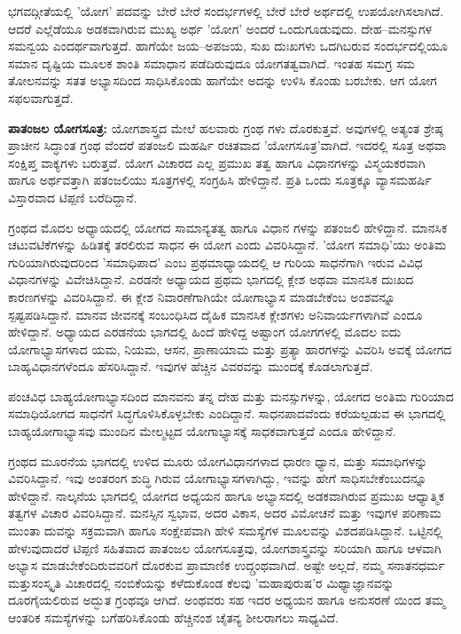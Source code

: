 ಭಗವದ್ಗೀತೆಯಲ್ಲಿ 'ಯೋಗ' ಪದವನ್ನು ಬೇರೆ ಬೇರೆ ಸಂದರ್ಭಗಳಲ್ಲಿ ಬೇರೆ ಬೇರೆ ಅರ್ಥದಲ್ಲಿ ಉಪಯೋಗಿಸಲಾಗಿದೆ. ಆದರೆ ಎಲ್ಲೆಡೆಯೂ ಅಡಕವಾಗಿರುವ ಮುಖ್ಯ ಅರ್ಥ 'ಯೋಗ' ಅಂದರೆ ಒಂದುಗೂಡುವುದು. ದೇಹ–ಮನಸ್ಸುಗಳ ಸಮನ್ವಯ ಎಂದರ್ಥವಾಗುತ್ತದೆ. ಹಾಗೆಯೇ ಜಯ–ಅಪಜಯ, ಸುಖ ದುಃಖಗಳು ಒದಗಿಬರುವ ಸಂದರ್ಭದಲ್ಲಿಯೂ ಸಮಾನ ದೃಷ್ಟಿಯ ಮೂಲಕ ಶಾಂತಿ ಸಮಾಧಾನ ಪಡೆದಿರುವುದೂ ಯೋಗತತ್ವವಾಗಿದೆ. ಇಂತಹ ಸಮಗ್ರ ಸಮ ತೋಲನವನ್ನು ಸತತ ಅಭ್ಯಾಸದಿಂದ ಸಾಧಿಸಿಕೊಂಡು ಹಾಗೆಯೇ ಅದನ್ನು ಉಳಿಸಿ ಕೊಂಡು ಬರಬೇಕು. ಆಗ ಯೋಗ ಸಫಲವಾಗುತ್ತದೆ.

\textbf{ಪಾತಂಜಲ ಯೋಗಸೂತ್ರ:} ಯೋಗಶಾಸ್ತ್ರದ ಮೇಲೆ ಹಲವಾರು ಗ್ರಂಥ ಗಳು ದೊರಕುತ್ತವೆ. ಅವುಗಳಲ್ಲಿ ಅತ್ಯಂತ ಶ್ರೇಷ್ಠ ಪ್ರಾಚೀನ ಸಿದ್ಧಾಂತ ಗ್ರಂಥ ವೆಂದರೆ ಪತಂಜಲಿ ಮಹರ್ಷಿ ರಚಿತವಾದ 'ಯೋಗಸೂತ್ರ'ವಾಗಿದೆ. ಇದರಲ್ಲಿ  ಸೂತ್ರ ಅಥವಾ ಸಂಕ್ಷಿಪ್ತ ವಾಕ್ಯಗಳು ಬರುತ್ತವೆ. ಯೋಗ ವಿಚಾರದ ಎಲ್ಲ ಪ್ರಮುಖ ತತ್ವ ಹಾಗೂ ವಿಧಾನಗಳನ್ನು ವಿಸ್ಮಯಕರವಾಗಿ ಹಾಗೂ ಅರ್ಥವತ್ತಾಗಿ ಪತಂಜಲಿಯು ಸೂತ್ರಗಳಲ್ಲಿ ಸಂಗ್ರಹಿಸಿ ಹೇಳಿದ್ದಾನೆ. ಪ್ರತಿ ಒಂದು ಸೂತ್ರಕ್ಕೂ ವ್ಯಾಸಮಹರ್ಷಿ ವಿಸ್ತಾರವಾದ ಟಿಪ್ಪಣಿ ಬರೆದಿದ್ದಾನೆ.

ಗ್ರಂಥದ ಮೊದಲ ಅಧ್ಯಾಯದಲ್ಲಿ ಯೋಗದ ಸಾಮಾನ್ಯತತ್ವ ಹಾಗೂ ವಿಧಾನ ಗಳನ್ನು ಪತಂಜಲಿ ಹೇಳಿದ್ದಾನೆ. ಮಾನಸಿಕ ಚಟುವಟಿಕೆಗಳನ್ನು ಹಿಡಿತಕ್ಕೆ ತರಲಿರುವ ಸಾಧನ ಈ ಯೋಗ ಎಂದು ವಿವರಿಸಿದ್ದಾನೆ. 'ಯೋಗ ಸಮಾಧಿ'ಯು ಅಂತಿಮ ಗುರಿಯಾಗಿರುವುದರಿಂದ 'ಸಮಾಧಿಪಾದ' ಎಂಬ ಪ್ರಥಮಾಧ್ಯಾಯದಲ್ಲಿ ಆ ಗುರಿಯ ಸಾಧನೆಗಾಗಿ ಇರುವ ವಿವಿಧ ವಿಧಾನಗಳನ್ನು ವಿವೇಚಿಸಿದ್ದಾನೆ. ಎರಡನೇ ಅಧ್ಯಾಯದ ಪ್ರಥಮ ಭಾಗದಲ್ಲಿ ಕ್ಲೇಶ ಅಥವಾ ಮಾನಸಿಕ ದುಃಖದ ಕಾರಣಗಳನ್ನು ವಿವರಿಸಿದ್ದಾನೆ. ಈ ಕ್ಲೇಶ ನಿವಾರಣೆಗಾಗಿಯೇ ಯೋಗಾಭ್ಯಾಸ ಮಾಡಬೇಕೆಂಬ ಅಂಶವನ್ನೂ ಸ್ಪಷ್ಟಪಡಿಸಿದ್ದಾನೆ. ಮಾನವ ಜೀವನಕ್ಕೆ ಸಂಬಂಧಿಸಿದ ದೈಹಿಕ ಮಾನಸಿಕ ಕ್ಲೇಶಗಳು ಅನಿವಾರ್ಯಗಳಾಗಿವೆ ಎಂದೂ ಹೇಳಿದ್ದಾನೆ. ಅಧ್ಯಾಯದ ಎರಡನೆಯ ಭಾಗದಲ್ಲಿ ಹಿಂದೆ ಹೇಳಿದ್ದ ಅಷ್ಟಾಂಗ ಯೋಗಗಳಲ್ಲಿ ಮೊದಲ ಐದು ಯೋಗಾಭ್ಯಾಸಗಳಾದ ಯಮ, ನಿಯಮ, ಆಸನ, ಪ್ರಾಣಾಯಾಮ ಮತ್ತು ಪ್ರತ್ಯಾ ಹಾರಗಳನ್ನು ವಿವರಿಸಿ ಅವಕ್ಕೆ ಯೋಗದ ಬಾಹ್ಯವಿಧಾನಗಳೆಂದೂ ಹೆಸರಿಸಿದ್ದಾನೆ. ಇವುಗಳ ಹೆಚ್ಚಿನ ವಿವರವನ್ನು ಮುಂದಕ್ಕೆ ಕೊಡಲಾಗುತ್ತದೆ.

ಪಂಚವಿಧ ಬಾಹ್ಯಯೋಗಾಭ್ಯಾಸದಿಂದ ಮಾನವನು ತನ್ನ ದೇಹ ಮತ್ತು ಮನಸ್ಸುಗಳನ್ನು, ಯೋಗದ ಅಂತಿಮ ಗುರಿಯಾದ ಸಮಾಧಿಯೋಗದ ಸಾಧನೆಗೆ ಸಿದ್ಧಗೊಳಿಸಿಕೊಳ್ಳಬೇಕು ಎಂದಿದ್ದಾನೆ. ಸಾಧನಪಾದವೆಂದು ಕರೆಯಲ್ಪಡುವ ಈ ಭಾಗದಲ್ಲಿ ಬಾಹ್ಯಯೋಗಾಭ್ಯಾಸವು ಮುಂದಿನ ಮೇಲ್ಮಟ್ಟದ ಯೋಗಾಭ್ಯಾಸಕ್ಕೆ ಸಾಧಕವಾಗುತ್ತದೆ ಎಂದೂ ಹೇಳಿದ್ದಾನೆ.

ಗ್ರಂಥದ ಮೂರನೆಯ ಭಾಗದಲ್ಲಿ ಉಳಿದ ಮೂರು ಯೋಗವಿಧಾನಗಳಾದ ಧಾರಣ ಧ್ಯಾನ, ಮತ್ತು ಸಮಾಧಿಗಳನ್ನು ವಿವರಿಸಿದ್ದಾನೆ. ಇವು ಅಂತರಂಗ ಶುದ್ಧಿ ಗಿರುವ ಯೋಗಾಭ್ಯಾಸಗಳಾಗಿದ್ದು, ಇವನ್ನು ಹೇಗೆ ಸಾಧಿಸಬೇಕೆಂಬುದನ್ನೂ ಹೇಳಿದ್ದಾನೆ. ನಾಲ್ಕನೆಯ ಭಾಗದಲ್ಲಿ ಯೋಗದ ಅಧ್ಯಯನ ಹಾಗೂ ಅಭ್ಯಾಸದಲ್ಲಿ ಅಡಕವಾಗಿರುವ ಪ್ರಮುಖ ಆಧ್ಯಾತ್ಮಿಕ ತತ್ವಗಳ ವಿಚಾರ ವಿವರಿಸಿದ್ದಾನೆ. ಮನಸ್ಸಿನ ಸ್ವಭಾವ, ಅದರ ವಿಕಾಸ, ಅದರ ವಿಮೋಚನೆ ಮತ್ತು ಇವುಗಳ ಪರಿಣಾಮ ಮುಂತಾ ದುವನ್ನು ಸಕ್ರಮವಾಗಿ ಹಾಗೂ ಸಂಕ್ಷೇಪವಾಗಿ ಹೇಳಿ ಸಮಸ್ಯೆಗಳ ಮೂಲವನ್ನು ವಿಶದಪಡಿಸಿದ್ದಾನೆ. ಒಟ್ಟಿನಲ್ಲಿ ಹೇಳುವುದಾದರೆ ಟಿಪ್ಪಣಿ ಸಹಿತವಾದ ಪಾತಂಜಲ ಯೋಗಸೂತ್ರವು, ಯೋಗಶಾಸ್ತ್ರವನ್ನು ಸರಿಯಾಗಿ ಹಾಗೂ ಆಳವಾಗಿ ಅಭ್ಯಾಸ ಮಾಡಬೇಕೆಂದಿರುವವರಿಗೆ ದೊರಕುವ ಪ್ರಾಮಾಣಿಕ ಉದ್ಗ್ರಂಥವಾಗಿದೆ. ಅಷ್ಟೇ ಅಲ್ಲದೆ, ನಮ್ಮ ಸನಾತನಧರ್ಮ ಮತ್ತುಸಂಸ್ಕೃತಿ ವಿಚಾರದಲ್ಲಿ ನಂಬಿಕೆಯನ್ನು ಕಳೆದುಕೊಂಡ ಕೆಲವು 'ಮಹಾಪುರುಷ'ರ ಮಿಥ್ಯಾಜ್ಞಾನವನ್ನು ದೂರಗೈಯಲಿರುವ ಅದ್ಭುತ ಗ್ರಂಥವೂ ಆಗಿದೆ. ಅಂಥವರು ಸಹ ಇದರ ಅಧ್ಯಯನ ಹಾಗೂ ಅನುಸರಣೆ ಯಿಂದ ತಮ್ಮ ಆಂತರಿಕ ಸಮಸ್ಯೆಗಳನ್ನು ಬಗೆಹರಿಸಿಕೊಂಡು ಹೆಚ್ಚಿನಂಶ ಚೈತನ್ಯ ಶೀಲರಾಗಲು ಸಾಧ್ಯವಿದೆ.

